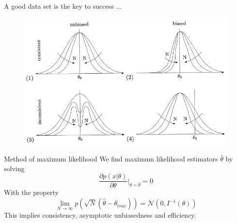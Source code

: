 \documentclass[
aspectratio=169,
14pt,
professionalfonts
]{beamer}
\begin{document}
\begin{frame}{A good data set is the key to success ...}
    \begin{figure}
    \centering
    \includegraphics[width=0.8\linewidth]{../plots/estimator.pdf}
\end{figure}
\end{frame}

\begin{frame}{Method of maximum likelihood}
    \vspace{-0.2cm}
    We find maximum likelihood estimators $ \hat \theta$ by solving
    $$
    \frac{\partial p(x|\theta)}{\partial \theta}\bigg\vert_{\theta = \hat \theta} = 0
    $$
    With the property
    $$
    \lim_{N \to \infty} p\left(\sqrt{N}(\hat \theta - \theta_{true})\right) = \mathcal{N}\left(0, I^{-1}(\theta)\right)
    $$
    This implies consistency, asymptotic unbiasedness and efficiency.
\end{frame}

\end{document}
